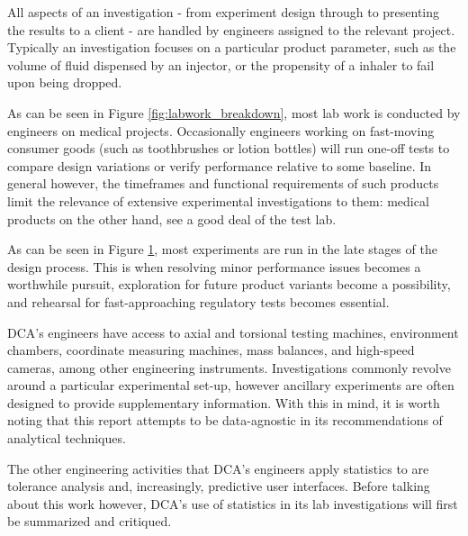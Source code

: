 \documentclass[11pt,a4paper,article]{memoir} %
\newlength\drop
\begin{document}
All aspects of an investigation - from experiment design through to presenting the results to a client - are handled by engineers assigned to the relevant project. Typically an investigation focuses on a particular product parameter, such as the volume of fluid dispensed by an injector, or the propensity of a inhaler to fail upon being dropped. 
\par
As can be seen in Figure \ref{fig:labwork_breakdown}, most lab work is conducted by engineers on medical projects.
Occasionally engineers working on fast-moving consumer goods (such as toothbrushes or lotion bottles) will run one-off tests to compare design variations or verify performance relative to some baseline. In general however, the timeframes and functional requirements of such products limit the relevance of extensive experimental investigations to them: medical products on the other hand, see a good deal of the test lab.
\par
As can be seen in Figure \ref{fig:time_of_tests}, most experiments are run in the late stages of the design process. This is when resolving minor performance issues becomes a worthwhile pursuit, exploration for future product variants become a possibility, and rehearsal for fast-approaching regulatory tests becomes essential.
\begin{figure}
\label{fig:time_of_tests}
\end{figure}
\par
DCA's engineers have access to axial and torsional testing machines, environment chambers, coordinate measuring machines, mass balances, and high-speed cameras, among other engineering instruments. Investigations commonly revolve around a particular experimental set-up, however ancillary experiments are often designed to provide supplementary information. With this in mind, it is worth noting that this report attempts to be data-agnostic in its recommendations of analytical techniques.
\par
The other engineering activities that DCA's engineers apply statistics to are tolerance analysis and, increasingly, predictive user interfaces. Before talking about this work however, DCA's use of statistics in its lab investigations will first be summarized and critiqued.

\end{document}
